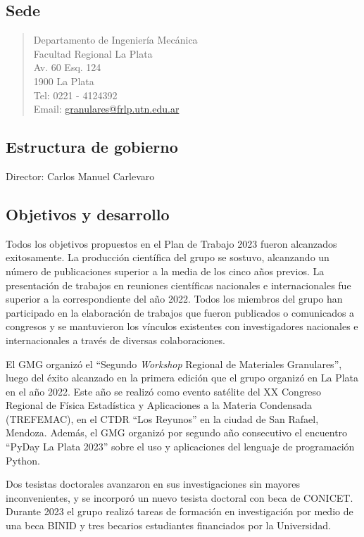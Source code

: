 \documentclass[a4paper,11pt,twoside,final,titlepage,onecolumn,openright]{report}
\begin{document}
 \subsection{Sede}
\begin{quote}
Departamento de Ingeniería Mecánica \\
Facultad Regional La Plata\\
Av. 60 Esq. 124\\
1900 La Plata \\
Tel: 0221 - 4124392\\
Email: \href{mailto://granulares@frlp.utn.edu.ar}{granulares@frlp.utn.edu.ar}
\end{quote}


\subsection{Estructura de gobierno}
Director: Carlos Manuel Carlevaro

\subsection{Objetivos y desarrollo}

Todos los objetivos propuestos en el Plan de Trabajo 2023 fueron alcanzados exitosamente. La producción científica del grupo se sostuvo, alcanzando un número de publicaciones superior a la media de los cinco años previos. La presentación de trabajos en reuniones científicas nacionales e internacionales fue superior a la correspondiente del año 2022. Todos los miembros del grupo han participado en la elaboración de trabajos que fueron publicados o comunicados a congresos y se mantuvieron los vínculos existentes con investigadores nacionales e internacionales a través de diversas colaboraciones.

El GMG organizó el ``Segundo \textit{Workshop} Regional de Materiales Granulares'', luego del éxito alcanzado en la primera edición que el grupo organizó en La Plata en el año 2022. Este año se realizó como evento satélite del XX Congreso Regional de Física Estadística y Aplicaciones a la Materia Condensada (TREFEMAC), en el CTDR ``Los Reyunos'' en la ciudad de San Rafael, Mendoza. Además, el GMG organizó por segundo año consecutivo el encuentro ``PyDay La Plata 2023'' sobre el uso y aplicaciones del lenguaje de programación Python.

Dos tesistas doctorales avanzaron en sus investigaciones sin mayores inconvenientes, y se incorporó un nuevo tesista doctoral con beca de CONICET. Durante 2023 el grupo realizó tareas de formación en investigación por medio de una beca BINID y tres becarios estudiantes financiados por la Universidad.
\end{document}
